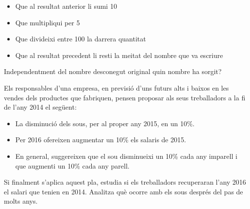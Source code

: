 \begin{activitats}
\begin{mylist}
\begin{itemize}
 \item Que al resultat anterior li sumi 10

 \item Que multipliqui per 5 

 \item  Que divideixi entre 100 la darrera quantitat 
 
 \item  Que al resultat precedent li resti la meitat del nombre que va escriure

\end{itemize} 

Independentment del nombre desconegut original quin nombre ha sorgit?


\exer  Els responsables d'una empresa, en previsió d'uns futurs alts i baixos en les vendes dels productes que fabriquen, pensen proposar als seus treballadors a la fi de l'any 2014 el següent: 
\begin{itemize}
\item  La disminució dels sous, per al proper any 2015, en un 10\%. 

\item  Per 2016 ofereixen augmentar un 10\% els salaris de 2015.

\item  En general, suggereixen que el sou disminueixi un 10\% cada any imparell i que augmenti un 10\% cada any parell. 
\end{itemize}

 Si finalment s'aplica aquest pla, estudia si els treballadors recuperaran l'any 2016 el salari que tenien en 2014. Analitza què ocorre amb els sous després del pas de molts anys.



\begin{comment}
\exer  Els responsables de l'anterior empresa, després de rebre l'informe d'una consultora, alteren la seva intenció inicial i van a proposar als seus treballadors, a la fi de l'any 2014, el següent: 


\exer 
\exer  Un augment dels sous, per al proper any 2015, d'un 10\%. 


\end{comment}
\end{mylist}
\end{activitats}
